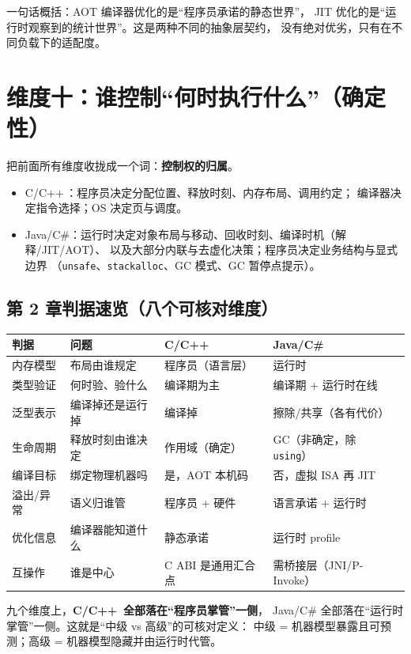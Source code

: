 \documentclass[12pt,a4paper,fontset=fandol]{ctexbook}
\newcommand{\Cplus}[1]{C++\,#1}
\begin{document}
一句话概括：AOT 编译器优化的是``程序员承诺的静态世界''，
JIT 优化的是``运行时观察到的统计世界''。这是两种不同的抽象层契约，
没有绝对优劣，只有在不同负载下的适配度。

\section{维度十：谁控制``何时执行什么''（确定性）}

把前面所有维度收拢成一个词：\textbf{控制权的归属}。

\begin{itemize}
  \item C/\allowbreak{}\Cplus{}：程序员决定分配位置、释放时刻、内存布局、调用约定；
        编译器决定指令选择；OS 决定页与调度。
  \item Java/C\#：运行时决定对象布局与移动、回收时刻、编译时机（解释/JIT/AOT）、
        以及大部分内联与去虚化决策；程序员决定业务结构与显式边界
        （\texttt{unsafe}、\texttt{stackalloc}、GC 模式、GC 暂停点提示）。
\end{itemize}

\begin{guideline}[title=本章小结：一张判据表]
\subsection{第 2 章判据速览（八个可核对维度）}

\begin{longtable}{@{}>{\raggedright\arraybackslash}p{}>{\raggedright\arraybackslash}p{}>{\raggedright\arraybackslash}p{}>{\raggedright\arraybackslash}p{}@{}}
\toprule
\textbf{判据} & \textbf{问题} & \textbf{C/\allowbreak{}\Cplus{}} & \textbf{Java/C\#} \\
\midrule
内存模型 & 布局由谁规定 & 程序员（语言层） & 运行时 \\
类型验证 & 何时验、验什么 & 编译期为主 & 编译期 + 运行时在线 \\
泛型表示 & 编译掉还是运行掉 & 编译掉 & 擦除/共享（各有代价） \\
生命周期 & 释放时刻由谁决定 & 作用域（确定） & GC（非确定，除 \texttt{using}） \\
编译目标 & 绑定物理机器吗 & 是，AOT 本机码 & 否，虚拟 ISA 再 JIT \\
溢出/异常 & 语义归谁管 & 程序员 + 硬件 & 语言承诺 + 运行时 \\
优化信息 & 编译器能知道什么 & 静态承诺 & 运行时 profile \\
互操作 & 谁是中心 & C ABI 是通用汇合点 & 需桥接层（JNI/P-Invoke） \\
\bottomrule
\end{longtable}

九个维度上，\textbf{C/\allowbreak{}\Cplus{} 全部落在``程序员掌管''一侧}，
Java/C\# 全部落在``运行时掌管''一侧。这就是``中级 vs 高级''的可核对定义：
中级 = 机器模型暴露且可预测；高级 = 机器模型隐藏并由运行时代管。
\end{guideline}
\end{document}
